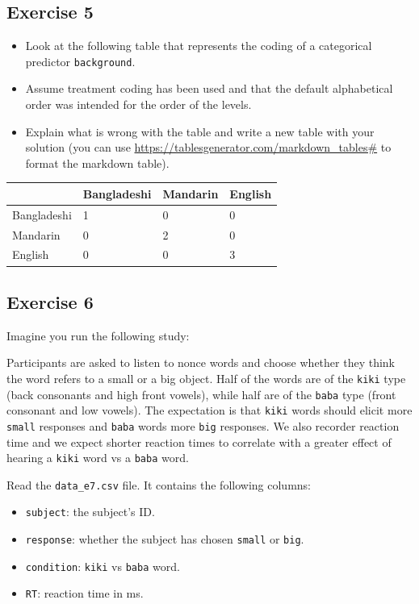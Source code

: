 \documentclass[
]{article}
\providecommand{\tightlist}{%
  \setlength{\itemsep}{0pt}\setlength{\parskip}{0pt}}
\begin{document}
\hypertarget{exercise-5}{%
\subsection{Exercise 5}\label{exercise-5}}

\begin{itemize}
\tightlist
\item
  Look at the following table that represents the coding of a
  categorical predictor \texttt{background}.
\item
  Assume treatment coding has been used and that the default
  alphabetical order was intended for the order of the levels.
\item
  Explain what is wrong with the table and write a new table with your
  solution (you can use
  \url{https://tablesgenerator.com/markdown_tables\#} to format the
  markdown table).
\end{itemize}

\begin{longtable}[]{@{}llll@{}}
\toprule()
& Bangladeshi & Mandarin & English \\
\midrule()
\endhead
Bangladeshi & 1 & 0 & 0 \\
Mandarin & 0 & 2 & 0 \\
English & 0 & 0 & 3 \\
\bottomrule()
\end{longtable}

\hypertarget{exercise-6}{%
\subsection{Exercise 6}\label{exercise-6}}

Imagine you run the following study:

Participants are asked to listen to nonce words and choose whether they
think the word refers to a small or a big object. Half of the words are
of the \texttt{kiki} type (back consonants and high front vowels), while
half are of the \texttt{baba} type (front consonant and low vowels). The
expectation is that \texttt{kiki} words should elicit more
\texttt{small} responses and \texttt{baba} words more \texttt{big}
responses. We also recorder reaction time and we expect shorter reaction
times to correlate with a greater effect of hearing a \texttt{kiki} word
vs a \texttt{baba} word.

Read the \texttt{data\_e7.csv} file. It contains the following columns:

\begin{itemize}
\tightlist
\item
  \texttt{subject}: the subject's ID.
\item
  \texttt{response}: whether the subject has chosen \texttt{small} or
  \texttt{big}.
\item
  \texttt{condition}: \texttt{kiki} vs \texttt{baba} word.
\item
  \texttt{RT}: reaction time in ms.
\end{itemize}
\end{document}
